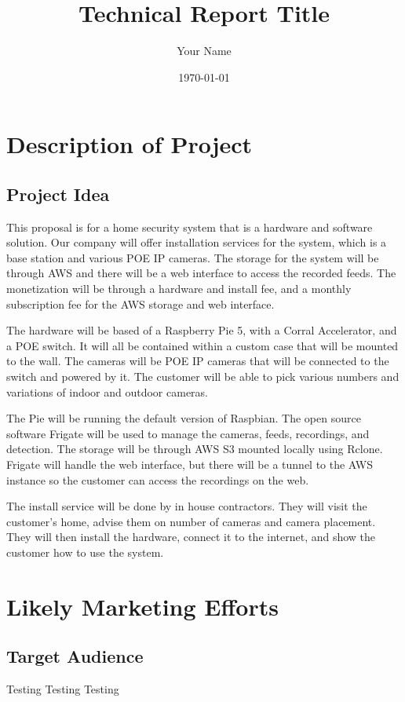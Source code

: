 \documentclass{report}
\title{Technical Report Title}
\author{Your Name}
\date{\today}
\begin{document}
\maketitle

\tableofcontents
\newpage

\chapter{Description of Project}
\section{Project Idea}
This proposal is for a home security system that is a hardware and software solution.
Our company will offer installation services for the system, which is a base station and various POE IP cameras.
The storage for the system will be through AWS and there will be a web interface to access the recorded feeds.
The monetization will be through a hardware and install fee, and a monthly subscription fee for the AWS storage and web interface.

The hardware will be based of a Raspberry Pie 5, with a Corral Accelerator, and a POE switch.
It will all be contained within a custom case that will be mounted to the wall.
The cameras will be POE IP cameras that will be connected to the switch and powered by it.
The customer will be able to pick various numbers and variations of indoor and outdoor cameras.

The Pie will be running the default version of Raspbian.
The open source software Frigate will be used to manage the cameras, feeds, recordings, and detection.
The storage will be through AWS S3 mounted locally using Rclone.
Frigate will handle the web interface, but there will be a tunnel to the AWS instance so the customer can access the recordings on the web.

The install service will be done by in house contractors.
They will visit the customer's home, advise them on number of cameras and camera placement.
They will then install the hardware, connect it to the internet, and show the customer how to use the system.


\chapter{Likely Marketing Efforts}
\section{Target Audience}
Testing Testing Testing
\end{document}

